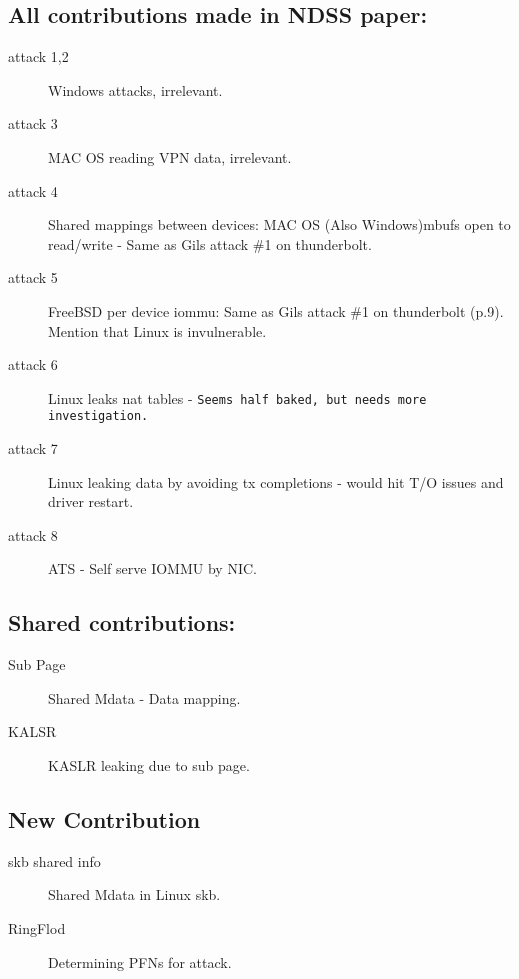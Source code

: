 \subsection{All contributions made in NDSS paper\cite{thunder}:}
\begin{description}
\item[attack 1,2] Windows attacks, irrelevant.
\item[attack 3 ] MAC OS reading VPN data, irrelevant.
\item[attack 4] Shared mappings between devices: MAC OS (Also Windows)mbufs open to read/write - Same as Gils  attack \#1 on thunderbolt.
\item[attack 5] FreeBSD per device iommu:  Same as Gils  attack \#1 on thunderbolt (p.9). Mention that Linux is invulnerable.
\item[attack 6] Linux leaks nat tables - \texttt{Seems half baked, but needs more investigation.}
\item[attack 7] Linux leaking data by avoiding tx completions - would hit T/O issues and driver restart.
\item[attack 8] ATS - Self serve IOMMU by NIC. 
\end{description}

\subsection{Shared contributions:}
\begin{description}
\item[Sub Page] Shared Mdata - Data mapping.
\item[KALSR] KASLR leaking due to sub page.
\end{description}

\subsection{New Contribution}

\begin{description}
\item[skb shared info] Shared Mdata in Linux skb.
\item[RingFlod] Determining PFNs for attack.
\end{description}

\newpage






